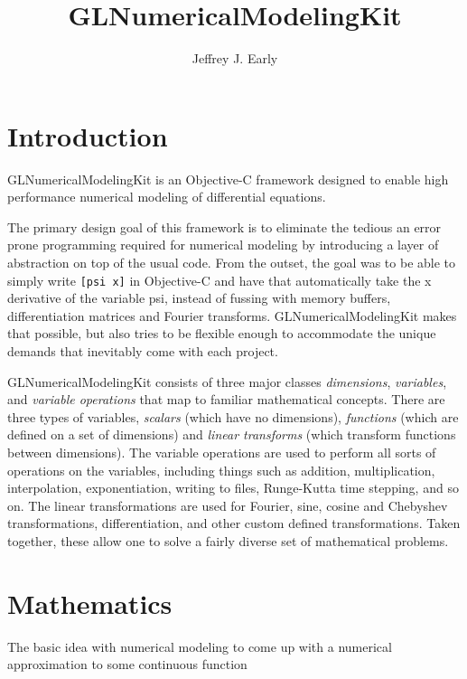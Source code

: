 \documentclass[11pt]{article}
\title{GLNumericalModelingKit}
\author{Jeffrey J. Early}
\begin{document}
\maketitle

%
%
\section{Introduction}

GLNumericalModelingKit is an Objective-C framework designed to enable high performance numerical modeling of differential equations.

The primary design goal of this framework is to eliminate the tedious an error prone programming required for numerical modeling by introducing a layer of abstraction on top of the usual code. From the outset, the goal was to be able to simply write \texttt{[psi x]} in Objective-C and have that automatically take the x derivative of the variable psi, instead of fussing with memory buffers, differentiation matrices and Fourier transforms. GLNumericalModelingKit makes that possible, but also tries to be flexible enough to accommodate the unique demands that inevitably come with each project.

GLNumericalModelingKit consists of three major classes \emph{dimensions}, \emph{variables}, and \emph{variable operations} that map to familiar mathematical concepts. There are three types of variables, \emph{scalars} (which have no dimensions), \emph{functions} (which are defined on a set of dimensions) and \emph{linear transforms} (which transform functions between dimensions). The variable operations are used to perform all sorts of operations on the variables, including things such as addition, multiplication, interpolation, exponentiation, writing to files, Runge-Kutta time stepping, and so on. The linear transformations are used for Fourier, sine, cosine and Chebyshev transformations, differentiation, and other custom defined transformations. Taken together, these allow one to solve a fairly diverse set of mathematical problems.

%
\section{Mathematics}
%

The basic idea with numerical modeling to come up with a numerical approximation to some continuous function
\end{document}
